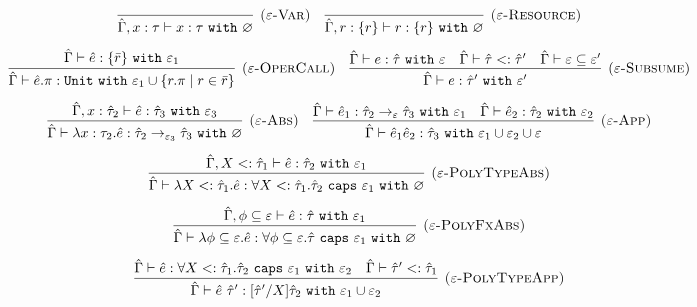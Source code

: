 \documentclass{llncs}
\newcommand{\keywadj}[1]{\mathtt{#1}}
\newcommand{\keyw}[1]{\keywadj{#1}~}
\newcommand{\kw}[1]{\keyw{ #1 }}
\newcommand{\poly}[2]{
	\forall #1. #2
}
\newcommand{\polycap}[3]{
	\forall #1. #2~ \kw{caps} #3
}
\begin{document}
\[
\begin{array}{c}

\infer[\textsc{($\varepsilon$-Var)}]
	{ \hat \Gamma, x:\tau \vdash x: \tau~\kw{with} \varnothing }
	{}
~~~
\infer[\textsc{($\varepsilon$-Resource)}]
 	{ \hat \Gamma, r: \{ r \} \vdash r : \{ r \}~\kw{with} \varnothing }
 	{}\\[2ex]
 

\infer[\textsc{($\varepsilon$-OperCall)}]
	{ \hat \Gamma \vdash \hat e.\pi: \kw{Unit} \kw{with} \varepsilon_1 \cup \{ r.\pi \mid r \in \bar r \} }
	{ \hat \Gamma \vdash \hat e: \{ \bar r \}~\kw{with} \varepsilon_1}
~~~
\infer[\textsc{($\varepsilon$-Subsume)}]
	{\hat \Gamma \vdash e: \hat \tau' ~\kw{with} \varepsilon'}
	{\hat \Gamma \vdash e: \hat \tau ~\kw{with} \varepsilon & \hat \Gamma \vdash \hat \tau <: \hat \tau' & \hat \Gamma \vdash \varepsilon \subseteq \varepsilon'}\\[2ex]

	\infer[\textsc{($\varepsilon$-Abs)}]
	{ \hat \Gamma \vdash \lambda x:\tau_2 . \hat e : \hat \tau_2 \rightarrow_{\varepsilon_3} \hat \tau_3~\kw{with} \varnothing }
	{ \hat \Gamma, x: \hat \tau_2 \vdash \hat e: \hat \tau_3~\kw{with} \varepsilon_3 }
	~~~
\infer[\textsc{($\varepsilon$-App)}]
	{ \hat \Gamma \vdash \hat e_1 \hat e_2 : \hat \tau_3~\kw{with} \varepsilon_1 \cup \varepsilon_2 \cup \varepsilon  }
	{ \hat \Gamma \vdash \hat e_1: \hat \tau_2 \rightarrow_{\varepsilon} \hat \tau_3~\kw{with} \varepsilon_1 & \hat \Gamma \vdash \hat e_2: \hat \tau_2~\kw{with} \varepsilon_2 } \\[2ex]

\infer[\textsc{($\varepsilon$-PolyTypeAbs)}]
	{ \hat \Gamma \vdash \lambda X <: \hat \tau_1. \hat e : \poly{X <: \hat \tau_1}{\hat \tau_2}~\kw{caps} \varepsilon_1~\kw{with} \varnothing }
	{ \hat \Gamma, X <: \hat \tau_1 \vdash \hat e: \hat \tau_2 ~\kw{with} \varepsilon_1 } \\[2ex]

\infer[\textsc{($\varepsilon$-PolyFxAbs)}]
	{ \hat \Gamma \vdash \lambda \phi \subseteq \varepsilon. \hat e : \forall \phi \subseteq \varepsilon. \hat \tau~\kw{caps} \varepsilon_1~\kw{with} \varnothing }
	{ \hat \Gamma, \phi \subseteq \varepsilon \vdash \hat e : \hat \tau ~\kw{with} \varepsilon_1 } \\[2ex]

\infer[\textsc{($\varepsilon$-PolyTypeApp)}]
	{ \hat \Gamma \vdash \hat e~\hat \tau' : [\hat \tau'/X]\hat \tau_2~\kw{with}  \varepsilon_1 \cup \varepsilon_2 }
	{ \hat \Gamma \vdash \hat e: \polycap{X <: \hat \tau_1}{\hat \tau_2}{\varepsilon_1}~\kw{with} \varepsilon_2 & \hat \Gamma \vdash \hat \tau' <: \hat \tau_1} \\[2ex]


\end{array}\]
\end{document}
